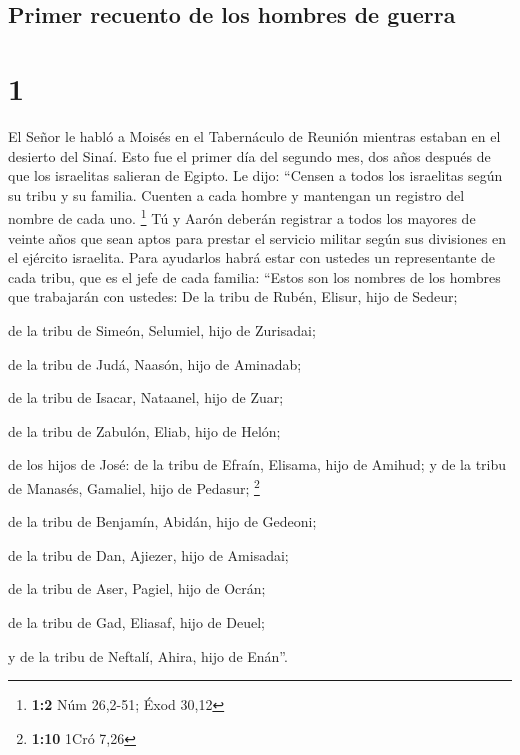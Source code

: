 \hypertarget{primer-recuento-de-los-hombres-de-guerra}{%
\subsection{Primer recuento de los hombres de
guerra}\label{primer-recuento-de-los-hombres-de-guerra}}

\hypertarget{section}{%
\section{1}\label{section}}

 El Señor le habló a Moisés en el Tabernáculo de Reunión
mientras estaban en el desierto del Sinaí. Esto fue el primer día del
segundo mes, dos años después de que los israelitas salieran de Egipto.
Le dijo:  ``Censen a todos los israelitas según su tribu y
su familia. Cuenten a cada hombre y mantengan un registro del nombre de
cada uno. \footnote{\textbf{1:2} Núm 26,2-51; Éxod 30,12} 
Tú y Aarón deberán registrar a todos los mayores de veinte años que sean
aptos para prestar el servicio militar según sus divisiones en el
ejército israelita.  Para ayudarlos habrá estar con
ustedes un representante de cada tribu, que es el jefe de cada familia:
 ``Estos son los nombres de los hombres que trabajarán con
ustedes: De la tribu de Rubén, Elisur, hijo de Sedeur;

 de la tribu de Simeón, Selumiel, hijo de Zurisadai;

 de la tribu de Judá, Naasón, hijo de Aminadab;

 de la tribu de Isacar, Nataanel, hijo de Zuar;

 de la tribu de Zabulón, Eliab, hijo de Helón;

 de los hijos de José: de la tribu de Efraín, Elisama,
hijo de Amihud; y de la tribu de Manasés, Gamaliel, hijo de Pedasur;
\footnote{\textbf{1:10} 1Cró 7,26}

 de la tribu de Benjamín, Abidán, hijo de Gedeoni;

 de la tribu de Dan, Ajiezer, hijo de Amisadai;

 de la tribu de Aser, Pagiel, hijo de Ocrán;

 de la tribu de Gad, Eliasaf, hijo de Deuel;

 y de la tribu de Neftalí, Ahira, hijo de Enán''.

